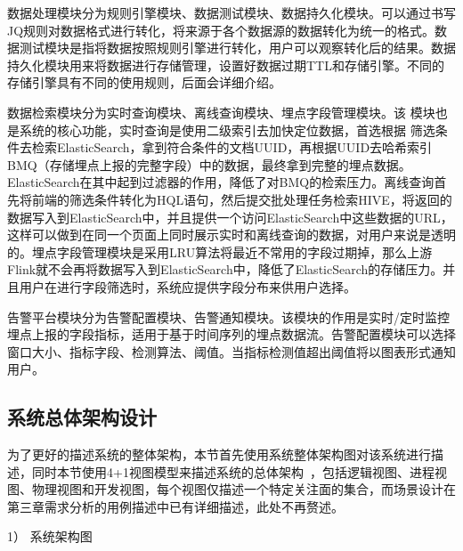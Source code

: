 数据处理模块分为规则引擎模块、数据测试模块、数据持久化模块。可以通过书写JQ规则对数据格式进行转化，将来源于各个数据源的数据转化为统一的格式。数据测试模块是指将数据按照规则引擎进行转化，用户可以观察转化后的结果。数据持久化模块用来将数据进行存储管理，设置好数据过期TTL和存储引擎。不同的存储引擎具有不同的使用规则，后面会详细介绍。

数据检索模块分为实时查询模块、离线查询模块、埋点字段管理模块。该
模块也是系统的核心功能，实时查询是使用二级索引去加快定位数据，首选根据
筛选条件去检索ElasticSearch，拿到符合条件的文档UUID，再根据UUID去哈希索引BMQ（存储埋点上报的完整字段）中的数据，最终拿到完整的埋点数据。ElasticSearch在其中起到过滤器的作用，降低了对BMQ的检索压力。离线查询首先将前端的筛选条件转化为HQL语句，然后提交批处理任务检索HIVE，将返回的数据写入到ElasticSearch中，并且提供一个访问ElasticSearch中这些数据的URL，这样可以做到在同一个页面上同时展示实时和离线查询的数据，对用户来说是透明的。埋点字段管理模块是采用LRU算法将最近不常用的字段过期掉，那么上游Flink就不会再将数据写入到ElasticSearch中，降低了ElasticSearch的存储压力。并且用户在进行字段筛选时，系统应提供字段分布来供用户选择。

告警平台模块分为告警配置模块、告警通知模块。该模块的作用是实时/定时监控埋点上报的字段指标，适用于基于时间序列的埋点数据流。告警配置模块可以选择窗口大小、指标字段、检测算法、阈值。当指标检测值超出阈值将以图表形式通知用户。

\subsection{系统总体架构设计}

为了更好的描述系统的整体架构，本节首先使用系统整体架构图对该系统进行描述，同时本节使用4+1视图模型来描述系统的总体架构~\cite{kruchten19954+}，包括逻辑视图、进程视图、物理视图和开发视图，每个视图仅描述一个特定关注面的集合，而场景设计在第三章需求分析的用例描述中已有详细描述，此处不再赘述。

1）	系统架构图

